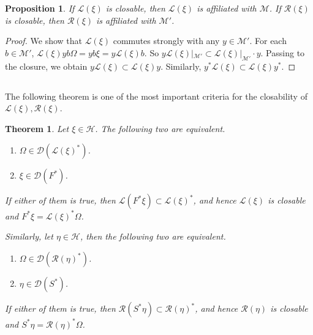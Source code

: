 \documentclass[12pt,b5paper,notitlepage]{article}
\theoremstyle{definition}
\theoremstyle{plain}
\newtheorem{thm}[df]{Theorem}
\newtheorem{pp}[df]{Proposition}
\newcommand{\mc}{\mathcal}
\newcommand{\Dom}{\scr{D}}
\newcommand{\scr}{\mathscr}
\numberwithin{equation}{section}
\begin{document}
\begin{pp}\label{lba13}
If $\scr L(\xi)$ is closable, then $\scr L(\xi)$ is affiliated with $\mc M$. If $\scr R(\xi)$ is closable, then $\scr R(\xi)$ is affiliated with $\mc M'$.
\end{pp}

\begin{proof}
We show that $\scr L(\xi)$ commutes strongly with any $y\in\mc M'$. For each $b\in\mc M'$, $\scr L(\xi)yb\Omega=yb\xi=y\scr L(\xi)b$. So $y\scr L(\xi)|_{\mc M'}\subset \scr L(\xi)|_{\mc M'}\cdot y$. Passing to the closure, we obtain $y\scr L(\xi)\subset \scr L(\xi)y$. Similarly, $y^*\scr L(\xi)\subset \scr L(\xi)y^*$.
\end{proof}



\subsection{}

The following theorem is one of the most important criteria for the closability of $\scr L(\xi),\scr R(\xi)$.

\begin{thm}\label{lba12}
Let $\xi\in\mc H$. The following two are equivalent.
\begin{enumerate}[label=(\alph*)]
	\item $\Omega\in\Dom(\scr L(\xi)^*)$.
	\item $\xi\in\Dom(F^*)$.
\end{enumerate}
If either of them is true, then $\scr L(F^*\xi)\subset\scr L(\xi)^*$, and hence $\scr L(\xi)$ is closable and $F^*\xi=\scr L(\xi)^*\Omega$.

Similarly, let $\eta\in\mc H$, then the following two are equivalent.
\begin{enumerate}
	\item[(a')] $\Omega\in\Dom(\scr R(\eta)^*)$.
	\item[(b')] $\eta\in\Dom(S^*)$.
\end{enumerate}
If either of them is true, then $\scr R(S^*\eta)\subset\scr R(\eta)^*$, and hence $\scr R(\eta)$ is closable and $S^*\eta=\scr R(\eta)^*\Omega$.
\end{thm}
\end{document}

